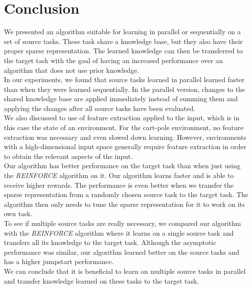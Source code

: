 \chapter{Conclusion}

We presented an algorithm suitable for learning in parallel or sequentially on a set of source tasks.
These task share a knowledge base, but they also have their proper sparse representation.
The learned knowledge can then be transferred to the target task with the goal of having an increased performance over an algorithm that does not use prior knowledge.\\

In our experiments, we found that source tasks learned in parallel learned faster than when they were learned sequentially.
In the parallel version, changes to the shared knowledge base are applied immediately instead of summing them and applying the changes after all source tasks have been evaluated.\\

We also discussed to use of feature extraction applied to the input, which is in this case the state of an environment.
For the cart-pole environment, no feature extraction was necessary and even slowed down learning.
However, environments with a high-dimensional input space generally require feature extraction in order to obtain the relevant aspects of the input.\\

Our algorithm has better performance on the target task than when just using the \textit{REINFORCE} algorithm on it.
Our algorithm learns faster and is able to receive higher rewards.
The performance is even better when we transfer the sparse representation from a randomly chosen source task to the target task.
The algorithm then only needs to tune the sparse representation for it to work on its own task.\\

To see if multiple source tasks are really necessary, we compared our algorithm with the \textit{REINFORCE} algorithm where it learns on a single source task and transfers all its knowledge to the target task.
Although the asymptotic performance was similar, our algorithm learned better on the source tasks and has a higher jumpstart performance.\\

We can conclude that it is beneficial to learn on multiple source tasks in parallel and transfer knowledge learned on these tasks to the target task.
